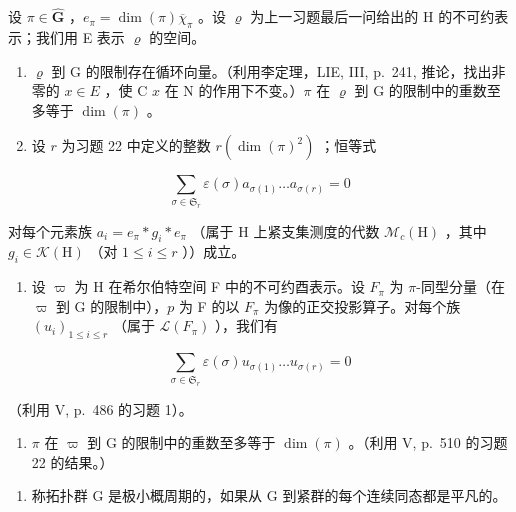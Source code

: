 设 \(\pi \in \widehat{\mathbf{G}}\) ，\(e_{\pi} = \dim (\pi)\overline{\chi}_{\pi}\) 。设 \(\varrho\) 为上一习题最后一问给出的 H 的不可约表示；我们用 E 表示 \(\varrho\) 的空间。

\begin{enumerate}
\def\labelenumi{\alph{enumi})}
\item
  \(\varrho\) 到 G 的限制存在循环向量。（利用李定理，LIE, III, p.~241, 推论，找出非零的 \(x \in E\) ，使 C \(x\) 在 N 的作用下不变。）\(\pi\) 在 \(\varrho\) 到 G 的限制中的重数至多等于 \(\dim(\pi)\) 。
\item
  设 \(r\) 为习题 22 中定义的整数 \(r(\dim (\pi)^2)\) ；恒等式
\end{enumerate}

\[
\sum_ {\sigma \in \mathfrak {S} _ {r}} \varepsilon (\sigma) a _ {\sigma (1)} \dots a _ {\sigma (r)} = 0
\]

对每个元素族 \(a_{i}=e_{\pi}*g_{i}*e_{\pi}\) （属于 H 上紧支集测度的代数 \(\mathcal{M}_{c}(\mathrm{H})\) ，其中 \(g_{i}\in\mathcal{K}(\mathrm{H})\) （对 \(1\leqslant i\leqslant r\) ））成立。

\begin{enumerate}
\def\labelenumi{\alph{enumi})}
\setcounter{enumi}{2}
\tightlist
\item
  设 \(\varpi\) 为 H 在希尔伯特空间 F 中的不可约酉表示。设 \(F_{\pi}\) 为 \(\pi\)-同型分量（在 \(\varpi\) 到 G 的限制中），\(p\) 为 F 的以 \(F_{\pi}\) 为像的正交投影算子。对每个族 \((u_i)_{1 \leqslant i \leqslant r}\) （属于 \(\mathcal{L}(F_{\pi})\) ），我们有
\end{enumerate}

\[
\sum_ {\sigma \in \mathfrak {S} _ {r}} \varepsilon (\sigma) u _ {\sigma (1)} \dots u _ {\sigma (r)} = 0
\]

  （利用 V, p.~486 的习题 1）。

\begin{enumerate}
\def\labelenumi{\alph{enumi})}
\setcounter{enumi}{3}
\tightlist
\item
  \(\pi\) 在 \(\varpi\) 到 G 的限制中的重数至多等于 \(\dim(\pi)\) 。（利用 V, p.~510 的习题 22 的结果。）
\end{enumerate}

\begin{enumerate}
\def\labelenumi{\arabic{enumi})}
\setcounter{enumi}{23}
\tightlist
\item
  称拓扑群 G 是极小概周期的，如果从 G 到紧群的每个连续同态都是平凡的。
\end{enumerate}

